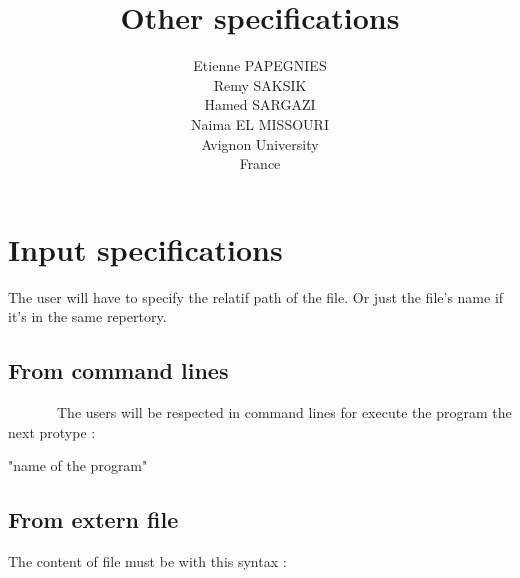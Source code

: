 \documentclass[11pt]{report}
\begin{document}
    \title{Other specifications}
    \author { 
    Etienne PAPEGNIES\\
    Remy SAKSIK\\
    Hamed SARGAZI\\
    Naima EL MISSOURI\\
    Avignon University\\
    France\\
}
   \maketitle

 \setcounter{tocdepth}{1}



    \tableofcontents
    
   \chapter*{Input specifications}  

  The user will have to specify the relatif path of the file.
  Or just the file's name if it's in the same repertory.
    \section{From command lines}
~~~~~~~The users will be respected in command lines for execute the program the next 
protype :

\begin{center}
 \begin{bf}"name of the program"\end{bf}
\end{center}

 \section{From extern file}

The content of file must be with this syntax :
\end{document}
